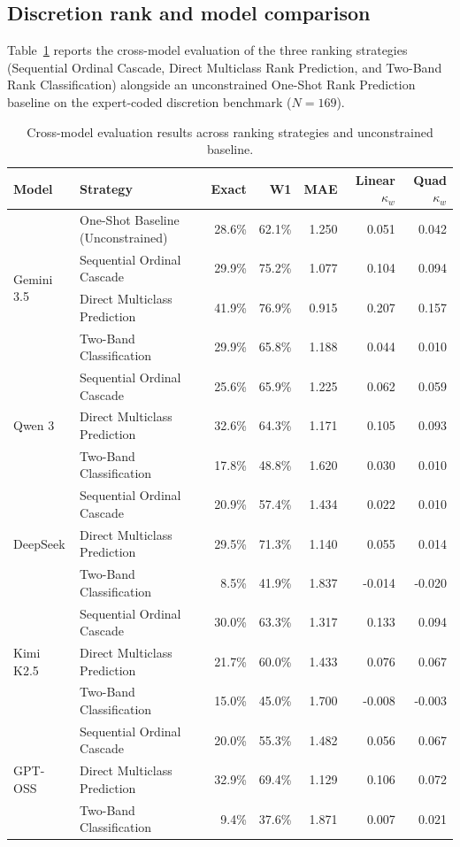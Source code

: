 \documentclass[runningheads]{llncs}
\begin{document}
\subsection{Discretion rank and model comparison}

Table~\ref{tab:multimodel_large} reports the cross-model evaluation of the three ranking strategies (Sequential Ordinal Cascade, Direct Multiclass Rank Prediction, and Two-Band Rank Classification) alongside an unconstrained One-Shot Rank Prediction baseline on the expert-coded discretion benchmark ($N=169$).

\begin{table}[t]
\centering
\begin{threeparttable}

\caption{Cross-model evaluation results across ranking strategies and unconstrained baseline.}
\label{tab:multimodel_large}
\scriptsize
\begin{tabular}{@{}llrrrrr@{}}
\toprule
\textbf{Model} & \textbf{Strategy} & \textbf{Exact} & \textbf{W1} & \textbf{MAE} & \textbf{Linear $\kappa_w$} & \textbf{Quad $\kappa_w$} \\
\midrule
\multirow{4}{*}{Gemini 3.5} 
  & One-Shot Baseline (Unconstrained) & 28.6\% & 62.1\% & 1.250 & 0.051 & 0.042 \\
  & Sequential Ordinal Cascade & 29.9\% & 75.2\% & 1.077 & 0.104 & 0.094 \\
  & Direct Multiclass Prediction & 41.9\% & 76.9\% & 0.915 & 0.207 & 0.157 \\
  & Two-Band Classification & 29.9\% & 65.8\% & 1.188 & 0.044 & 0.010 \\
\midrule
\multirow{3}{*}{Qwen 3} 
  & Sequential Ordinal Cascade & 25.6\% & 65.9\% & 1.225 & 0.062 & 0.059 \\
  & Direct Multiclass Prediction & 32.6\% & 64.3\% & 1.171 & 0.105 & 0.093 \\
  & Two-Band Classification & 17.8\% & 48.8\% & 1.620 & 0.030 & 0.010 \\
\midrule
\multirow{3}{*}{DeepSeek} 
  & Sequential Ordinal Cascade & 20.9\% & 57.4\% & 1.434 & 0.022 & 0.010 \\
  & Direct Multiclass Prediction & 29.5\% & 71.3\% & 1.140 & 0.055 & 0.014 \\
  & Two-Band Classification & 8.5\% & 41.9\% & 1.837 & -0.014 & -0.020 \\
\midrule
\multirow{3}{*}{Kimi K2.5} 
  & Sequential Ordinal Cascade & 30.0\% & 63.3\% & 1.317 & 0.133 & 0.094 \\
  & Direct Multiclass Prediction & 21.7\% & 60.0\% & 1.433 & 0.076 & 0.067 \\
  & Two-Band Classification & 15.0\% & 45.0\% & 1.700 & -0.008 & -0.003 \\
\midrule
\multirow{3}{*}{GPT-OSS} 
  & Sequential Ordinal Cascade & 20.0\% & 55.3\% & 1.482 & 0.056 & 0.067 \\
  & Direct Multiclass Prediction & 32.9\% & 69.4\% & 1.129 & 0.106 & 0.072 \\
  & Two-Band Classification & 9.4\% & 37.6\% & 1.871 & 0.007 & 0.021 \\
\bottomrule
\end{tabular}


\end{threeparttable}
\end{table}
\end{document}
